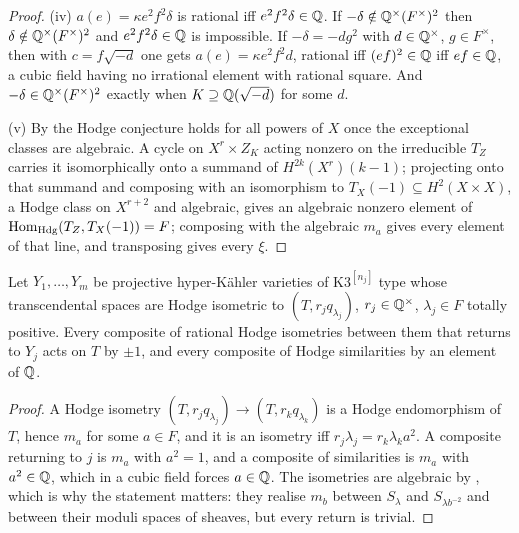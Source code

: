 \begin{proof}
(iv) $a(e)=\kappa e^{2}f^{2}\delta$ is rational iff $e^{2}f^{2}\delta\in\mathbb{Q}$. If $-\delta\notin\mathbb{Q}^{\times}(F^{\times})^{2}$ then $\delta\notin\mathbb{Q}^{\times}(F^{\times})^{2}$ and $e^{2}f^{2}\delta\in\mathbb{Q}$ is impossible. If $-\delta=-dg^{2}$ with $d\in\mathbb{Q}^{\times}$, $g\in F^{\times}$, then with $c=f\sqrt{-d}$ one gets $a(e)=\kappa e^{2}f^{2}d$, rational iff $(ef)^{2}\in\mathbb{Q}$ iff $ef\in\mathbb{Q}$, a cubic field having no irrational element with rational square. And $-\delta\in\mathbb{Q}^{\times}(F^{\times})^{2}$ exactly when $K\supseteq\mathbb{Q}(\sqrt{-d})$ for some $d$.

(v) By \cite[Thm.~21.7]{BMB26} the Hodge conjecture holds for all powers of $X$ once the exceptional classes are algebraic. A cycle on $X^{r}\times Z_{K}$ acting nonzero on the irreducible $T_{Z}$ carries it isomorphically onto a summand of $H^{2k}(X^{r})(k-1)$; projecting onto that summand and composing with an isomorphism to $T_{X}(-1)\subseteq H^{2}(X\times X)$, a Hodge class on $X^{r+2}$ and algebraic, gives an algebraic nonzero element of $\mathrm{Hom}_{\mathrm{Hdg}}(T_{Z},T_{X}(-1))=F$; composing with the algebraic $m_{a}$ gives every element of that line, and transposing gives every $\xi$.
\end{proof}

\begin{proposition}\label{prop:hk}
Let $Y_{1},\dots,Y_{m}$ be projective hyper-K\"ahler varieties of K3$^{[n_{j}]}$ type whose transcendental spaces are Hodge isometric to $(T,r_{j}q_{\lambda_{j}})$, $r_{j}\in\mathbb{Q}^{\times}$, $\lambda_{j}\in F$ totally positive. Every composite of rational Hodge isometries between them that returns to $Y_{j}$ acts on $T$ by $\pm1$, and every composite of Hodge similarities by an element of $\mathbb{Q}$.
\end{proposition}

\begin{proof}
A Hodge isometry $(T,r_{j}q_{\lambda_{j}})\to(T,r_{k}q_{\lambda_{k}})$ is a Hodge endomorphism of $T$, hence $m_{a}$ for some $a\in F$, and it is an isometry iff $r_{j}\lambda_{j}=r_{k}\lambda_{k}a^{2}$. A composite returning to $j$ is $m_{a}$ with $a^{2}=1$, and a composite of similarities is $m_{a}$ with $a^{2}\in\mathbb{Q}$, which in a cubic field forces $a\in\mathbb{Q}$. The isometries are algebraic by \cite{Bus19,Mar24}, which is why the statement matters: they realise $m_{b}$ between $S_{\lambda}$ and $S_{\lambda b^{-2}}$ and between their moduli spaces of sheaves, but every return is trivial.
\end{proof}

